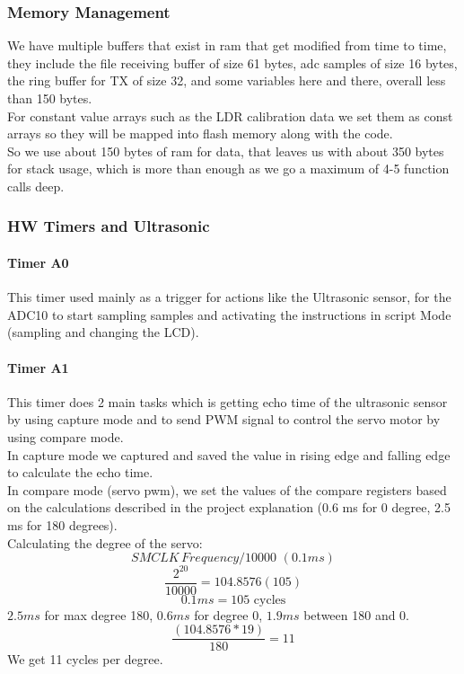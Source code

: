 \documentclass{article}
\begin{document}
\subsubsection{Memory Management}
We have multiple buffers that exist in ram that get modified from time to time, they include the file receiving buffer of size 61 bytes, adc samples of size 16 bytes, the ring buffer for TX of size 32, and some variables here and there, overall less than 150 bytes.\\
For constant value arrays such as the LDR calibration data we set them as const arrays so they will be mapped into flash memory along with the code.\\
So we use about 150 bytes of ram for data, that leaves us with about 350 bytes for stack usage, which is more than enough as we go a maximum of 4-5 function calls deep.

\subsubsection{HW Timers and Ultrasonic}

\paragraph{Timer A0\\}
This timer used mainly as a trigger for actions like the Ultrasonic sensor, for the ADC10 to start sampling samples and activating the instructions in script Mode (sampling and changing the LCD).

\paragraph{Timer A1\\}
This timer does 2 main tasks which is getting echo time of the ultrasonic sensor by using capture mode and to send PWM signal to control the servo motor by using compare mode.\\
In capture mode we captured and saved the value in rising edge and falling edge to calculate the echo time.\\
In compare mode (servo pwm), we set the values of the compare registers based on the calculations described in the project explanation (0.6 ms for 0 degree, 2.5 ms for 180 degrees).\\
Calculating the degree of the servo:\\
\[SMCLK\, Frequency / 10000\,\,(0.1ms)\]
\[\frac{2^{20}}{10000} = 104.8576(105)\]
\[0.1ms = 105 \text{  cycles}\]
$2.5ms$ for max degree 180, $0.6ms$ for degree 0, $1.9ms$ between 180 and 0.
\[\frac{(104.8576 * 19)}{180} = 11\]
We get 11 cycles per degree.\\
\end{document}
